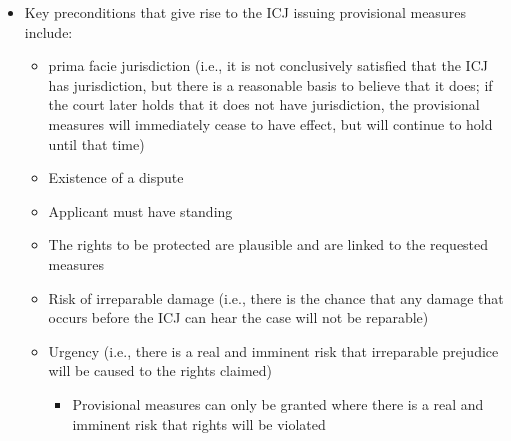 \begin{itemize}
    \item Key preconditions that give rise to the ICJ issuing provisional measures include:
    \begin{itemize}
        \item \Gls{prima facie} jurisdiction (i.e., it is not conclusively satisfied that the ICJ has jurisdiction, but there is a reasonable basis to believe that it does; if the court later holds that it does not have jurisdiction, the provisional measures will immediately cease to have effect, but will continue to hold until that time)
        \item Existence of a dispute
        \item Applicant must have standing
        \item The rights to be protected are plausible and are linked to the requested measures
        \item Risk of irreparable damage (i.e., there is the chance that any damage that occurs before the ICJ can hear the case will not be reparable)
        \item Urgency (i.e., there is a real and imminent risk that irreparable prejudice will be caused to the rights claimed)
        \begin{itemize}
            \item Provisional measures can only be granted where there is a real and imminent risk that rights will be violated
        \end{itemize}
    \end{itemize}
\end{itemize}

